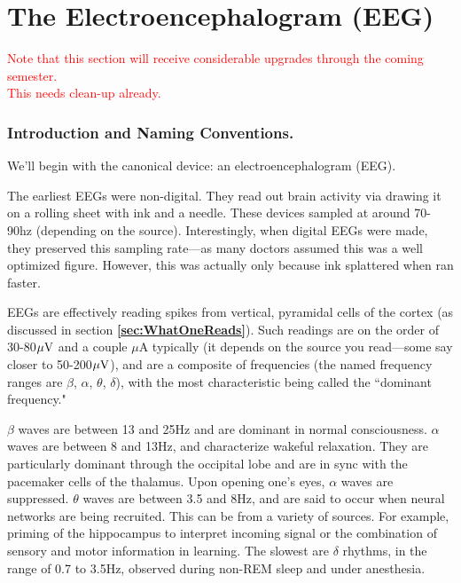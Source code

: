     







\section{The Electroencephalogram (EEG)}

\textcolor{red}{Note that this section will receive considerable upgrades through the coming semester.} \\

\textcolor{red}{This needs clean-up already.}

\subsubsection{Introduction and Naming Conventions.}

We'll begin with the canonical device: an electroencephalogram (EEG).\newline

The earliest EEGs were non-digital. They read out brain activity via drawing it on a rolling sheet with ink and a needle. These devices sampled at around 70-90hz (depending on the source). Interestingly, when digital EEGs were made, they preserved this sampling rate---as many doctors assumed this was a well optimized figure. However, this was actually only because ink splattered when ran faster.\newline

EEGs are effectively reading spikes from vertical, pyramidal cells of the cortex (as discussed in section \textbf{\ref{sec:WhatOneReads}}). Such readings are on the order of 30-80$\mu{\rm V}$ and a couple $\mu$A typically (it depends on the source you read---some say closer to 50-200$\mu{\rm V}$), and are a composite of frequencies (the named frequency ranges are $\beta$, $\alpha$, $\theta$, $\delta$), with the most characteristic being called the ``dominant frequency."\newline

$\beta$ waves are between 13 and 25Hz and are dominant in normal consciousness. $\alpha$ waves are between 8 and 13Hz, and characterize wakeful relaxation. They are particularly dominant through the occipital lobe and are in sync with the pacemaker cells of the thalamus. Upon opening one's eyes, $\alpha$ waves are suppressed. $\theta$ waves are between 3.5 and 8Hz, and are said to occur when neural networks are being recruited. This can be from a variety of sources. For example, priming of the hippocampus to interpret incoming signal or the combination of sensory and motor information in learning. The slowest are $\delta$ rhythms, in the range of 0.7 to 3.5Hz, observed during non-REM sleep and under anesthesia.\newline

